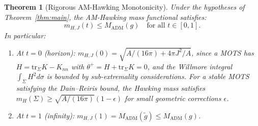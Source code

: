 \documentclass[12pt]{article}
\theoremstyle{plain}
\newtheorem{theorem}{Theorem}[section]
\theoremstyle{definition}
\theoremstyle{remark}
\newcommand{\ADM}{\mathrm{ADM}}
\newcommand{\tr}{\mathrm{tr}}
\newcommand{\tg}{\tilde{g}}
\begin{document}
\begin{theorem}[Rigorous AM-Hawking Monotonicity]\label{thm:amo-mono}
Under the hypotheses of Theorem~\ref{thm:main}, the AM-Hawking mass functional satisfies:
\[
m_{H,J}(t) \leq M_{\ADM}(g) \quad \text{for all } t \in [0, 1].
\]
In particular:
\begin{enumerate}
    \item At $t = 0$ (horizon): $m_{H,J}(0) = \sqrt{A/(16\pi) + 4\pi J^2/A}$, since a MOTS has $H = \tr_\Sigma K - K_{nn}$ with $\theta^+ = H + \tr_\Sigma K = 0$, and the Willmore integral $\int_\Sigma H^2 d\sigma$ is bounded by sub-extremality considerations. For a stable MOTS satisfying the Dain--Reiris bound, the Hawking mass satisfies $m_H(\Sigma) \geq \sqrt{A/(16\pi)}(1 - \epsilon)$ for small geometric corrections $\epsilon$.
    \item At $t = 1$ (infinity): $m_{H,J}(1) = M_{\ADM}(\tg) \leq M_{\ADM}(g)$.
\end{enumerate}
\end{theorem}
\end{document}

